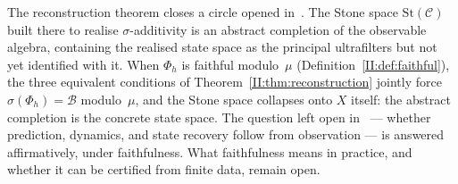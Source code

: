 The reconstruction theorem closes a circle opened in~\cite{mahon_paper1}.
The Stone space $\mathrm{St}(\mathcal{C})$ built there to realise
$\sigma$-additivity is an abstract completion of the observable algebra,
containing the realised state space as the principal ultrafilters but
not yet identified with it.  When $\Phi_h$ is faithful modulo~$\mu$
(Definition~\ref{II:def:faithful}), the three equivalent conditions of
Theorem~\ref{II:thm:reconstruction} jointly force $\sigma(\Phi_h) =
\mathcal{B}$ modulo~$\mu$, and the Stone space collapses onto $X$
itself: the abstract completion is the concrete state space.  The
question left open in~\cite{mahon_paper1} --- whether prediction,
dynamics, and state recovery follow from observation --- is answered
affirmatively, under faithfulness.  What faithfulness means in practice,
and whether it can be certified from finite data, remain open.

\ifstandalone


\fi

